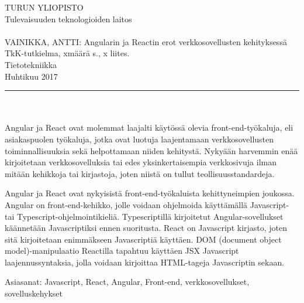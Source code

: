 \documentclass[a4paper,12pt,twoside]{article} %
\begin{document}
\begin{minipage}{15cm}

\noindent
TURUN YLIOPISTO\\
Tulevaisuuden teknologioiden laitos\\
\\
VAINIKKA, ANTTI: Angularin ja Reactin erot verkkosovellusten kehityksessä\\
TkK-tutkielma, xmäärä s., x liites.\\
Tietotekniikka\\
Huhtikuu 2017\\
\rule{\textwidth}{.2mm}\\
\\
Angular ja React ovat molemmat laajalti käytössä olevia front-end-työkaluja, eli asiakaspuolen työkaluja, jotka ovat luotuja laajentamaan verkkosovellusten toiminnallisuuksia sekä helpottamaan niiden kehitystä. Nykyään harvemmin enää kirjoitetaan verkkosovelluksia tai edes yksinkertaisempia verkkosivuja ilman mitään kehikkoja tai kirjastoja, joten niistä on tullut teollisuusstandardeja.

\vspace{4mm}\noindent Angular ja React ovat nykyisistä front-end-työkaluista kehittyneimpien joukossa. Angular on front-end-kehikko, jolle voidaan ohjelmoida käyttämällä Javascript- tai Typescript-ohjelmointikieliä. Typescriptillä kirjoitetut Angular-sovellukset käännetään Javascriptiksi ennen suoritusta. React on Javascript kirjasto, joten sitä kirjoitetaan enimmäkseen Javascriptiä käyttäen. DOM (document object model)-manipulaatio Reactilla tapahtuu käyttäen JSX Javascript laajennussyntaksia, jolla voidaan kirjoittaa HTML-tageja Javascriptin sekaan.

\vspace{4mm}\noindent Asiasanat: Javascript, React, Angular, Front-end, verkkosovellukset, sovelluskehykset

\end{minipage}
\newpage
\tableofcontents
\newpage
\pagestyle{plain} 
\setcounter{page}{1}

\addtolength{\oddsidemargin}{1.1cm}
\addtolength{\voffset}{2.3cm}
\end{document}
